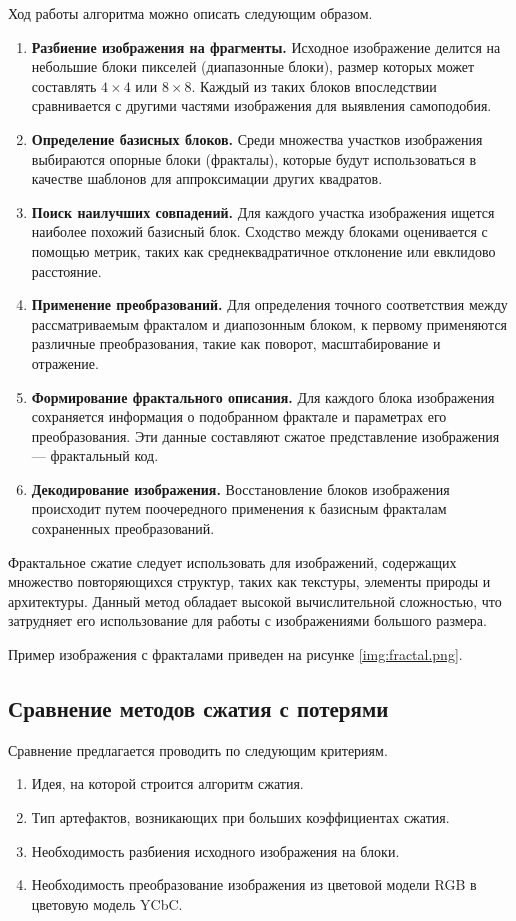 Ход работы алгоритма можно описать следующим образом.
\begin{enumerate}
    \item \textbf{Разбиение изображения на фрагменты.} Исходное изображение делится на небольшие блоки пикселей (диапазонные блоки), размер которых может составлять $4 \times 4$ или $8 \times 8$. Каждый из таких блоков впоследствии сравнивается с другими частями изображения для выявления самоподобия.
    \item \textbf{Определение базисных блоков.} Среди множества участков изображения выбираются опорные блоки (фракталы), которые будут использоваться в качестве шаблонов для аппроксимации других квадратов.
    \item \textbf{Поиск наилучших совпадений.} Для каждого участка изображения ищется наиболее похожий базисный блок. Сходство между блоками оценивается с помощью метрик, таких как среднеквадратичное отклонение или евклидово расстояние.
    \item \textbf{Применение преобразований.} Для определения точного соответствия между рассматриваемым фракталом и диапозонным блоком, к первому применяются различные преобразования, такие как поворот, масштабирование и отражение. 
    \item \textbf{Формирование фрактального описания.} Для каждого блока изображения сохраняется информация о подобранном фрактале и параметрах его преобразования. Эти данные составляют сжатое представление изображения --- фрактальный код.
    \item \textbf{Декодирование изображения.} Восстановление блоков изображения происходит путем поочередного применения к базисным фракталам сохраненных преобразований.
\end{enumerate}

Фрактальное сжатие следует использовать для изображений, содержащих множество повторяющихся структур, таких как текстуры, элементы природы и архитектуры. Данный метод обладает высокой вычислительной сложностью, что затрудняет его использование для работы с изображениями большого размера.

Пример изображения с фракталами приведен на рисунке \ref{img:fractal.png}.

\subsection{Сравнение методов сжатия с потерями}

Сравнение предлагается проводить по следующим критериям.
\begin{enumerate}
    \item Идея, на которой строится алгоритм сжатия.
    \item Тип артефактов, возникающих при больших коэффициентах сжатия.
    \item Необходимость разбиения исходного изображения на блоки.
    \item Необходимость преобразование изображения из цветовой модели RGB в цветовую модель YCbC.
\end{enumerate}

